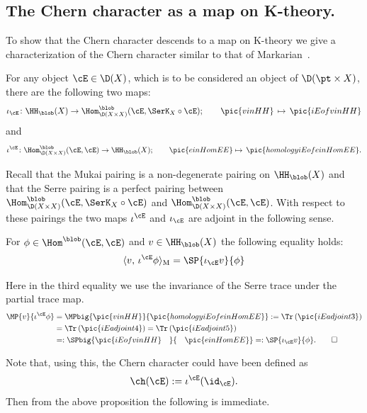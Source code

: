  \subsection{The Chern character as a map on K-theory.}
\label{subsec:iotae}
To show that the Chern character descends to a map on K-theory we give
a characterization of the Chern character similar to that of
Markarian~\cite{Mar}.

For any object $\cE\in \D(X)$, which is to be considered an object of
$\D( \pt\times X)$, there are the following two maps:
\[\iota_\cE\colon \HH_\blob(X)\to \Hom_{\D(X\times X)}^\blob(\cE,\SerK_X\circ \cE);
\qquad\pic{vinHH}\,\mapsto \,\pic{iEofvinHH}\]
and
\[\iota^\cE\colon \Hom_{\D(X\times X)}^\blob(\cE,\cE)\to\HH_\blob(X);
\qquad\pic{einHomEE}\mapsto \,\pic{homologyiEofeinHomEE}. \]

Recall that the Mukai pairing is a non-degenerate pairing on $\HH_\blob(X)$ and that the Serre pairing is a perfect pairing between $\Hom_{\D(X\times X)}^\blob(\cE,\SerK_X\circ \cE)$
and $\Hom_{\D(X\times X)}^\blob(\cE,\cE)$.
 With respect to these pairings the two maps $\iota^\cE$ and
$\iota_\cE$ are adjoint in the following sense.

\begin{Proposition}\label{prop:iotasadjoint}
  For $\phi\in \Hom^\blob(\cE,\cE)$ and $v\in \HH_\blob(X)$ the
  following equality holds:
  \[\langle v,\, \iota^\cE\phi\rangle_{\rm M} =\SP{\iota_\cE v}{\phi}\]
\end{Proposition}

\begin{Proof}
  Here in the third equality we use the invariance of the Serre trace
  under the partial trace map.
  \begin{align*}
    \MP{v}{\iota^\cE\phi}&=
    \MPbig{\pic{vinHH}}{\pic{homologyiEofeinHomEE}}
    :=\Tr\left(\pic{iEadjoint3}\right)\\&=
    \Tr\left(\pic{iEadjoint4}\right)
    =\Tr\left(\pic{iEadjoint5}\right)\\
    &=: \SPbig{\pic{iEofvinHH}\quad}{\quad\pic{einHomEE}} =:\SP{\iota_\cE
      v}{\phi}.\qedhere
  \end{align*}
\end{Proof}
\noindent
Note that, using this, the Chern character could have been defined as
\[\ch(\cE):=\iota^\cE(\id_\cE).\]
Then from the above proposition the following is immediate.


